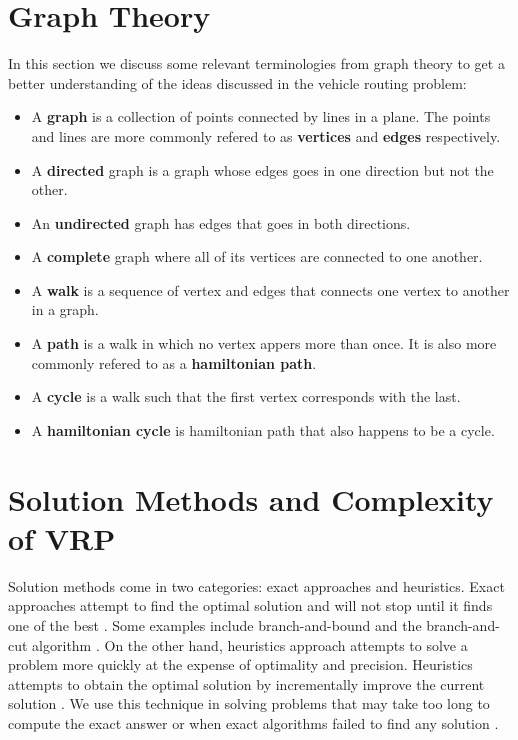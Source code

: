 \section{Graph Theory}
In this section we discuss some relevant terminologies \cite{wilson1996} from graph theory to get a better understanding of
the ideas discussed in the vehicle routing problem:
\begin{itemize}
\item A \textbf{graph} is a collection of points connected by lines in a plane. The points and lines are
more commonly refered to as \textbf{vertices} and \textbf{edges} respectively.
\item A \textbf{directed} graph is a graph whose edges goes in one direction but not the other.
\item An \textbf{undirected} graph has edges that goes in both directions.
\item A \textbf{complete} graph where all of its vertices are connected to one another.
\item A \textbf{walk} is a sequence of vertex and edges that connects one vertex to another in a graph.
\item A \textbf{path} is a walk in which no vertex appers more than once. It is also more commonly refered to as a \textbf{hamiltonian path}.
\item A \textbf{cycle} is a walk such that the first vertex corresponds with the last.
\item A \textbf{hamiltonian cycle} is hamiltonian path that also happens to be a cycle.
\end{itemize}

\section{Solution Methods and Complexity of VRP}
Solution methods come in two categories: exact approaches and heuristics. Exact approaches attempt
to find the optimal solution and will not stop until it finds one of the best \cite{neo:exact}. Some examples
include branch-and-bound \cite{LPVanderbei} and the branch-and-cut algorithm \cite{ILPCoursera}. On the other hand, heuristics approach
 attempts to solve a problem more quickly at the expense of optimality and precision. Heuristics attempts to obtain the optimal solution by incrementally improve
 the current solution \cite{Laporte1999}. We use this technique in
solving problems that may take too long to compute the exact answer or when exact algorithms failed to find any solution \cite{neo:exact}.

